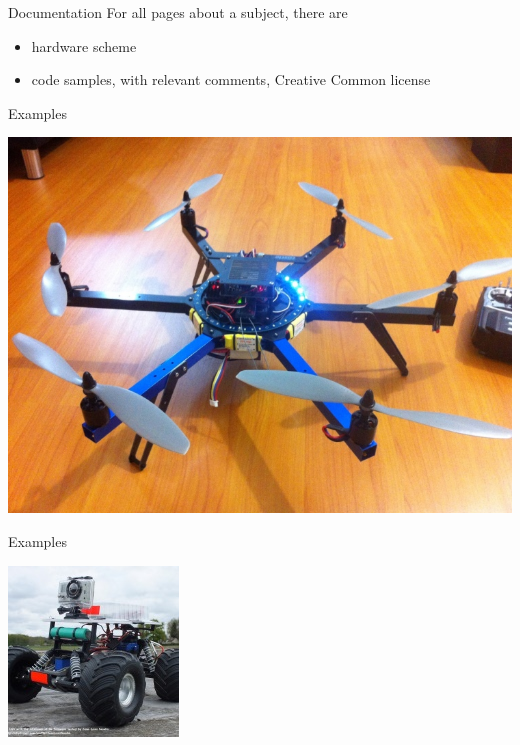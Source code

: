 \begin{frame}{Documentation}
	For all pages about a subject, there are
	\begin{itemize}
		\item hardware scheme
		\item code samples, with relevant comments, Creative Common license
	\end{itemize}
\end{frame}

\begin {frame} {Examples}
	\begin {center}
		\includegraphics [width=.7\textwidth,keepaspectratio] {img/drone}
	\end {center}
\end {frame}

\begin {frame} {Examples}
	\begin {center}
		\includegraphics [width=.5\textwidth,keepaspectratio] {img/rover}
	\end {center}
\end {frame}

